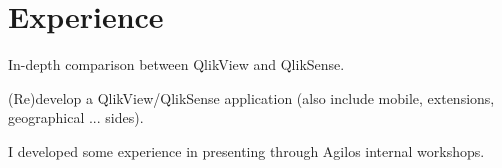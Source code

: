 \documentclass[letterpaper]{deedy-resume} %
\begin{document}
\hfill
%
%
\begin{minipage}[t]{0.66\textwidth} %


\section{Experience}

\vspace{\topsep} %
\begin{tightitemize}
\item In-depth comparison between QlikView and QlikSense.
\item (Re)develop a QlikView/QlikSense application (also include mobile, extensions, geographical ... sides).
\item I developed some experience in presenting through Agilos internal workshops.
\end{tightitemize}

\sectionspace %



\end{minipage}
\end{document}
